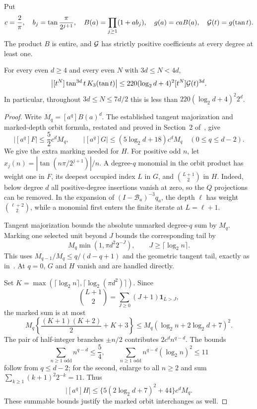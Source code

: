 \documentclass[11pt,a4paper]{article}
\theoremstyle{remark}\newtheorem*{ednote}{Editorial note (ProveIt, 2026-10-01)}
\begin{document}
Put
\[
 c=\frac2\pi,\quad b_j=\tan\frac{\pi}{2^{j+1}},\quad
 B(a)=\prod_{j\ge1}(1+ab_j),\quad
 g(a)=caB(a),\quad \mathcal G(t)=g(\tan t).
\]
The product $B$ is entire, and $\mathcal G$ has strictly positive coefficients at every degree at least one.
\begin{lemma}\label{lem:cubic}
For every even $d\ge4$ and every even $N$ with $3d\le N<4d$,
\[
 \left|[t^N]\tan^{3d}t\,K_3(\tan t)\right|
 \le220(\log_2d+4)^2[t^N]\mathcal G(t)^{3d}.
\]
In particular, throughout $3d\le N\le7d/2$ this is less than
$220(\log_2d+4)^2 2^d$.
\end{lemma}
\begin{proof}
Write $M_q=[a^q]B(a)^d$. The established tangent majorization and marked-depth orbit formula, restated and proved in Section~2 of~\cite{AllOrders}, give
\begin{equation}\label{eq:FGjets}
 |[a^q]F|\le\frac52c^dM_q,\qquad
 |[a^q]G|\le(5\log_2d+18)c^dM_q
 \quad(0\le q\le d-2).
\end{equation}
We give the extra marking needed for $H$. For positive odd $n$, let
$x_j(n)=|\tan(n\pi/2^{j+1})|/n$. A degree-$q$ monomial in the orbit product has weight one in $F$, its deepest occupied index $L$ in $G$, and $\binom{L+1}{2}$ in $H$. Indeed, below degree $d$ all positive-degree insertions vanish at zero, so the $Q$ projections can be removed. In the expansion of $(I-\mathcal B_a)^{-3}q_a$, the depth $\ell$ has weight $\binom{\ell+2}{2}$, while a monomial first enters the finite iterate at $L=\ell+1$.

Tangent majorization bounds the absolute unmarked degree-$q$ sum by $M_q$. Marking one selected unit beyond $J$ bounds the corresponding tail by
\[
 M_q\min(1,\pi d^2 2^{-J}),\qquad J\ge\lceil\log_2n\rceil.
\]
This uses $M_{q-1}/M_q\le q/(d-q+1)$ and the geometric tangent tail, exactly as in~\cite{AllOrders}. At $q=0$, $G$ and $H$ vanish and are handled directly.

Set $K=\max(\lceil\log_2n\rceil,\lceil\log_2(\pi d^2)\rceil)$. Since
\[
 \binom{L+1}{2}=\sum_{J\ge0}(J+1)\mathbf1_{L>J},
\]
the marked sum is at most
\[
 M_q\left\{\frac{(K+1)(K+2)}2+K+3\right\}
 \le M_q(\log_2n+2\log_2d+7)^2.
\]
The pair of half-integer branches $\pm n/2$ contributes $2c^dn^{q-d}$. The bounds
\[
 \sum_{n\ge1\text{ odd}}n^{q-d}\le\frac54,\qquad
 \sum_{n\ge1\text{ odd}}n^{q-d}(\log_2n)^2\le11
\]
follow from $q\le d-2$; for the second, enlarge to all $n\ge2$ and sum
$\sum_{k\ge1}(k+1)^2 2^{-k}=11$. Thus
\begin{equation}\label{eq:Hjet}
 |[a^q]H|\le\{5(2\log_2d+7)^2+44\}c^dM_q.
\end{equation}
These summable bounds justify the marked orbit interchanges as well.


\end{proof}
\end{document}
